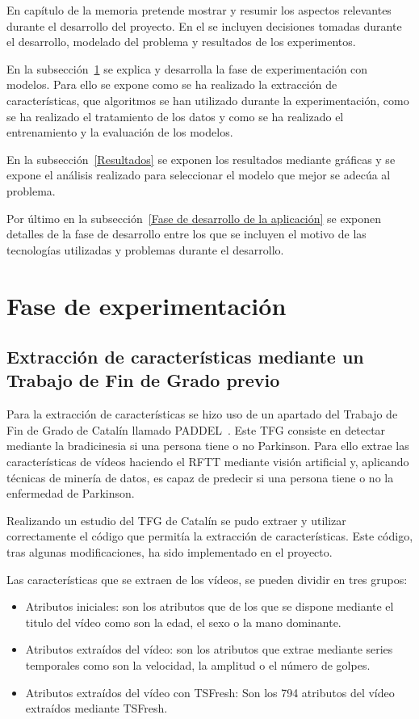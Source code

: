 
En capítulo de la memoria pretende mostrar y resumir los aspectos relevantes durante el desarrollo del proyecto. En el se incluyen decisiones tomadas durante el desarrollo, modelado del problema y resultados de los experimentos.

En la subsección~\ref{Fase de experimentación} se explica y desarrolla la fase de experimentación con modelos. Para ello se expone como se ha realizado la extracción de características, que algoritmos se han utilizado durante la experimentación, como se ha realizado el tratamiento de los datos y como se ha realizado el entrenamiento y la evaluación de los modelos.

En la subsección~\ref{Resultados} se exponen los resultados mediante gráficas y se expone el análisis realizado para seleccionar el modelo que mejor se adecúa al problema.

Por último en la subsección~\ref{Fase de desarrollo de la aplicación} se exponen detalles de la fase de desarrollo entre los que se incluyen el motivo de las tecnologías utilizadas y problemas durante el desarrollo.

\section{Fase de experimentación}
\label{Fase de experimentación}
\subsection{Extracción de características mediante un Trabajo de Fin de Grado previo}

Para la extracción de características se hizo uso de un apartado del Trabajo de Fin de Grado de Catalín llamado PADDEL~\cite{paddelRepo}. Este TFG consiste en detectar mediante la bradicinesia si una persona tiene o no Parkinson. Para ello extrae las características de vídeos haciendo el RFTT mediante visión artificial y, aplicando técnicas de minería de datos, es capaz de predecir si una persona tiene o no la enfermedad de Parkinson.

Realizando un estudio del TFG de Catalín se pudo extraer y utilizar correctamente el código que permitía la extracción de características. Este código, tras algunas modificaciones, ha sido implementado en el proyecto.

Las características que se extraen de los vídeos, se pueden dividir en tres grupos:
\begin{itemize}
\item Atributos iniciales: son los atributos que de los que se dispone mediante el titulo del vídeo como son la edad, el sexo o la mano dominante.
\item Atributos extraídos del vídeo: son los atributos que extrae mediante series temporales como son la velocidad, la amplitud o el número de golpes.
\item Atributos extraídos del vídeo con TSFresh: Son los 794 atributos
del vídeo extraídos mediante TSFresh.
\end{itemize}


